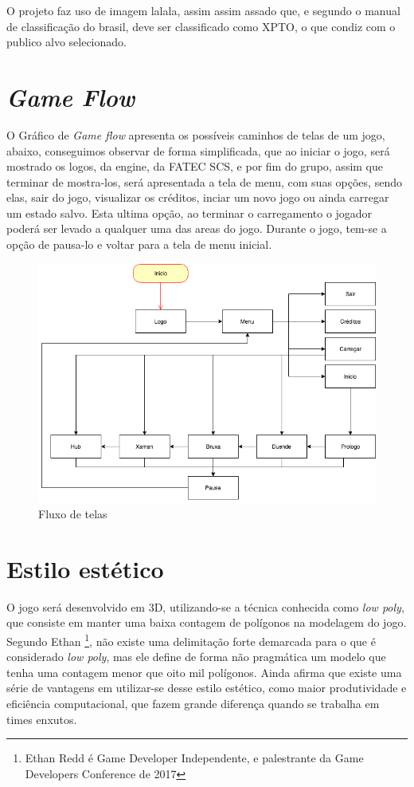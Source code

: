 O projeto faz uso de imagem lalala, assim assim assado que, e segundo o manual de classificação do brasil, deve ser classificado como XPTO, o que condiz com o publico alvo selecionado.

\section{\textit{Game Flow}}

O Gráfico de \textit{Game flow} apresenta os possíveis caminhos de telas de um jogo, abaixo, conseguimos observar de forma simplificada, que ao iniciar o jogo, será mostrado os logos, da engine, da FATEC SCS, e por fim do grupo, assim que terminar de mostra-los, será apresentada a tela de menu, com suas opções, sendo elas, sair do jogo, visualizar os créditos, inciar um novo jogo ou ainda carregar um estado salvo. Esta ultima opção, ao terminar o carregamento o jogador poderá ser levado a qualquer uma das areas do jogo.
Durante o jogo, tem-se a opção de pausa-lo e voltar para a tela de menu inicial.


\begin{figure}[!htb]
    \caption{\label{fig_grafico}Fluxo de telas} \begin{center}
    \includegraphics[width=\textwidth]{imagens/Flow.png} \end{center}
 \end{figure}

\section{Estilo estético}
O jogo será desenvolvido em 3D, utilizando-se a técnica conhecida como \textit{low poly}, que consiste em manter uma baixa contagem de polígonos na modelagem do jogo. Segundo Ethan  \footnote{Ethan Redd é Game Developer Independente, e palestrante da Game Developers Conference de 2017}, não existe uma delimitação forte demarcada para o que é considerado \textit{low poly}, mas ele define de forma não pragmática um modelo que tenha uma contagem menor que oito mil polígonos. Ainda afirma que existe uma série de vantagens em utilizar-se desse estilo estético, como maior produtividade e eficiência computacional, que fazem grande diferença quando se trabalha em times enxutos.

